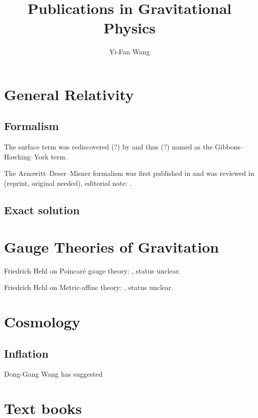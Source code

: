 \documentclass[a4paper]{article}
\title{Publications in Gravitational Physics}
\author{Yi-Fan Wang}
\begin{document}
\maketitle



\section{General Relativity}

\subsection{Formalism}

The surface term was rediscovered (?) by \cite{Gibbons1977,York1972} and thus
(?) named as the Gibbons--Hawking--York term.

The Arnowitt--Deser--Misner formalism was first published in \cite{Arnowitt1959}
and was reviewed in \cite{Arnowitt2008} (reprint, original needed), editorial
note: \cite{Pullin2008}.

\subsection{Exact solution}

\section{Gauge Theories of Gravitation}

Friedrich Hehl on Poincar\'e gauge theory: \cite{Hehl1976}, status unclear.

Friedrich Hehl on Metric-affine theory: \cite{Hehl1995}, status unclear.

\section{Cosmology}

\subsection{Inflation}

Dong-Gang Wang has suggested \cite{Baumann2011}

\section{Text books}
\end{document}
